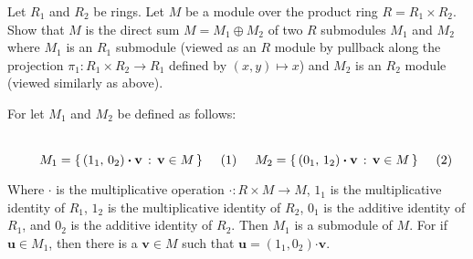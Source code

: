 \documentclass[crop=false,class=article]{standalone}                           %
\begin{document}
        \begin{problem}
            Let $R_{1}$ and $R_{2}$ be rings. Let $M$ be a module over
            the product ring $R=R_{1}\times{R}_{2}$. Show that $M$ is
            the direct sum $M=M_{1}\oplus{M}_{2}$ of two
            $R$ submodules $M_{1}$ and $M_{2}$ where $M_{1}$ is an
            $R_{1}$ submodule (viewed as an $R$ module by pullback along
            the projection $\pi_{1}:R_{1}\times{R}_{2}\rightarrow{R}_{1}$
            defined by $(x,y)\mapsto{x}$) and $M_{2}$ is an
            $R_{2}$ module (viewed similarly as above).
        \end{problem}
        \begin{solution}
            For let $M_{1}$ and $M_{2}$ be defined as follows:
            \par
            \begin{subequations}
                \begin{minipage}[b]{0.49\textwidth}
                    \begin{equation}
                        M_{1}=\{\,(1_{1},\,0_{2})
                                \boldsymbol{\cdot}\mathbf{v}\,:\,
                                \mathbf{v}\in{M}\,\}
                    \end{equation}
                \end{minipage}
                \hfill
                \begin{minipage}[b]{0.49\textwidth}
                    \begin{equation}
                        M_{2}=\{\,(0_{1},\,1_{2})
                                \boldsymbol{\cdot}\mathbf{v}\,:\,
                                \mathbf{v}\in{M}\,\}
                    \end{equation}
                \end{minipage}
            \end{subequations}
            \par\vspace{2.5ex}
            Where $\boldsymbol{\cdot}$ is the multiplicative operation
            $\boldsymbol{\cdot}:R\times{M}\rightarrow{M}$,
            $1_{1}$ is the multiplicative identity of $R_{1}$,
            $1_{2}$ is the multiplicative identity of $R_{2}$,
            $0_{1}$ is the additive identity of $R_{1}$, and
            $0_{2}$ is the additive identity of $R_{2}$. Then
            $M_{1}$ is a submodule of $M$. For if $\mathbf{u}\in{M}_{1}$,
            then there is a $\mathbf{v}\in{M}$ such that
            $\mathbf{u}=(1_{1},0_{2})\boldsymbol{\cdot}\mathbf{v}$.

\end{solution}
\end{document}
